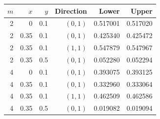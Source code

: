 \begin{tabular}{rrrrrr}
\toprule
$m$ & $x$ & $y$ & Direction & Lower & Upper\\
\midrule
2 & 0 & 0.1 & $(0,1)$ & 0.517001 & 0.517020\\
2 & 0.35 & 0.1 & $(0,1)$ & 0.425340 & 0.425472\\
2 & 0.35 & 0.1 & $(1,1)$ & 0.547879 & 0.547967\\
2 & 0.35 & 0.5 & $(0,1)$ & 0.052280 & 0.052294\\
4 & 0 & 0.1 & $(0,1)$ & 0.393075 & 0.393125\\
4 & 0.35 & 0.1 & $(0,1)$ & 0.332960 & 0.333064\\
4 & 0.35 & 0.1 & $(1,1)$ & 0.462509 & 0.462586\\
4 & 0.35 & 0.5 & $(0,1)$ & 0.019082 & 0.019094\\
\bottomrule
\end{tabular}
